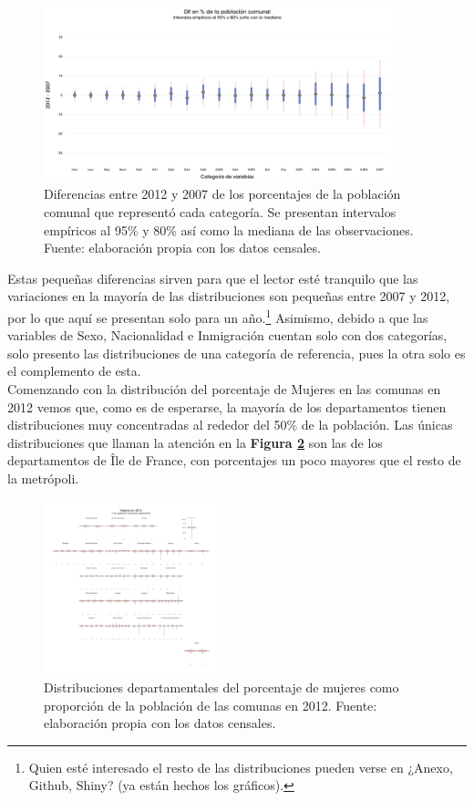 \begin{figure}[h]
	\centering
	\includegraphics[width = 0.9\textwidth]{Figs/AED/Cambio_Pct_Comunal_Cat}
	\caption{Diferencias entre 2012 y 2007 de los porcentajes de la población comunal que representó cada categoría. Se presentan intervalos empíricos al 95\% y 80\% así como la mediana de las observaciones. Fuente: elaboración propia con los datos censales.}
	\label{fig:Dif_Pct_Cat_Censales}	
\end{figure}

Estas pequeñas diferencias sirven para que el lector esté tranquilo que las variaciones en la mayoría de las distribuciones son pequeñas entre 2007 y 2012, por lo que aquí se presentan solo para un año.\footnote{Quien esté interesado el resto de las distribuciones pueden verse en {\color{red} ¿Anexo, Github, Shiny?} (ya están hechos los gráficos).} Asimismo, debido a que las variables de Sexo, Nacionalidad e Inmigración cuentan solo con dos categorías, solo presento las distribuciones de una categoría de referencia, pues la otra solo es el complemento de esta.\\

Comenzando con la distribución del porcentaje de Mujeres en las comunas en 2012 vemos que, como es de esperarse, la mayoría de los departamentos tienen distribuciones muy concentradas al rededor del 50\% de la población. Las únicas distribuciones que llaman la atención en la \textbf{Figura \ref{fig:Distr_por_Dpto_Muj_2012}} son las de los departamentos de Île de France, con porcentajes un poco mayores que el resto de la metrópoli.\\ 

\begin{figure}[h]
	\centering
	\includegraphics[width = 0.45\textwidth]{Figs/AED/Geofacet_Distr_por_Dpto_Muj_2012}
	\caption{Distribuciones departamentales del porcentaje de mujeres como proporción de la población de las comunas en 2012. Fuente: elaboración propia con los datos censales.}
	\label{fig:Distr_por_Dpto_Muj_2012}	
\end{figure}

